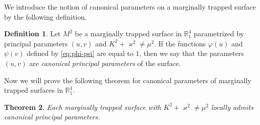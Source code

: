 \documentclass[12pt]{amsart}
\newcommand{\R}{\mathbb R}
\newtheorem{thm}{Theorem}[section]
\theoremstyle{definition}
\newtheorem{defn}[thm]{Definition}
\theoremstyle{remark}
\numberwithin{equation}{section}
\begin{document}
We introduce the notion of canonical parameters on a marginally trapped surface by the following definition.

\begin{defn} \label{D:def-can}
Let $M^2$ be a marginally trapped surface in $\R^4_1$ parametrized by principal parameters $(u,v)$ and  $K^2+\varkappa^2 \neq \mu^2$. If the functions $\varphi(u)$ and $\psi(v)$ defined by \eqref{eq:phi-psi} are equal to 1, then we say that the parameters $(u,v)$ are {\it canonical principal parameters} of the surface.
\end{defn}

Now we will prove the following theorem for canonical parameters of marginally trapped surfaces in $\R^4_1$.


\begin{thm} \label{eq:ExistenceCanonicalParameters}
	Each marginally trapped surface with  $K^2+\varkappa^2 \neq \mu^2$ locally admits canonical principal parameters.
\end{thm}
\end{document}

